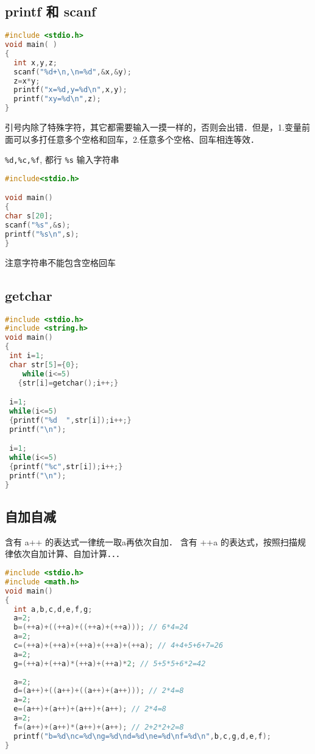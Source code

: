

\begin{issues}
\issueDraft
\end{issues}

\subsection{printf 和 scanf}
\begin{lstlisting}[language=cpp]
#include <stdio.h>
void main( )
{
  int x,y,z;
  scanf("%d+\n,\n=%d",&x,&y);
  z=x*y;
  printf("x=%d,y=%d\n",x,y);
  printf("xy=%d\n",z);
}
\end{lstlisting}
引号内除了特殊字符，其它都需要输入一摸一样的，否则会出错．但是，1.变量前面可以多打任意多个空格和回车，2.任意多个空格、回车相连等效．
 
\verb|%d,%c,%f|, 都行 \verb|%s| 输入字符串
\begin{lstlisting}[language=cpp]
#include<stdio.h>

void main()
{
char s[20];
scanf("%s",&s);
printf("%s\n",s);
}
\end{lstlisting}
注意字符串不能包含空格回车

\subsection{getchar}
\begin{lstlisting}[language=cpp]
#include <stdio.h>
#include <string.h>
void main()
{
 int i=1;
 char str[5]={0};
    while(i<=5)
   {str[i]=getchar();i++;}

 i=1;
 while(i<=5)
 {printf("%d  ",str[i]);i++;}
 printf("\n");

 i=1;
 while(i<=5)
 {printf("%c",str[i]);i++;}
 printf("\n");
}
\end{lstlisting}

\subsection{自加自减}
含有 a++ 的表达式一律统一取a再依次自加． 含有 ++a 的表达式，按照扫描规律依次自加计算、自加计算．．．
\begin{lstlisting}[language=cpp]
#include <stdio.h>
#include <math.h>
void main()
{
  int a,b,c,d,e,f,g;
  a=2;
  b=(++a)+((++a)+((++a)+(++a))); // 6*4=24
  a=2;
  c=(++a)+(++a)+(++a)+(++a)+(++a); // 4+4+5+6+7=26
  a=2;
  g=(++a)+(++a)*(++a)+(++a)*2; // 5+5*5+6*2=42
  
  a=2;
  d=(a++)+((a++)+((a++)+(a++))); // 2*4=8
  a=2;
  e=(a++)+(a++)+(a++)+(a++); // 2*4=8
  a=2;
  f=(a++)+(a++)*(a++)+(a++); // 2+2*2+2=8
  printf("b=%d\nc=%d\ng=%d\nd=%d\ne=%d\nf=%d\n",b,c,g,d,e,f);
}
\end{lstlisting}
